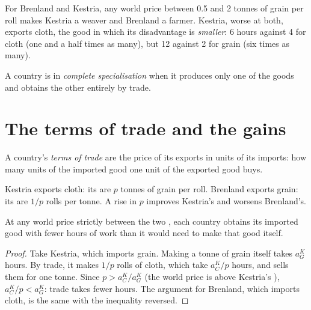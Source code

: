 For Brenland and Kestria, any world price between 0.5 and 2 tonnes of grain per roll makes Kestria a
weaver and Brenland a farmer. Kestria, worse at both, exports cloth, the good in which its disadvantage
is \emph{smaller}: 6 hours against 4 for cloth (one and a half times as many), but 12 against 2 for grain (six times as
many).

\begin{definition}\label{def:g10:ricardo-model:complete-specialisation}
A country is in \emph{complete specialisation} when it produces only one of
the goods and obtains the other entirely by trade.
\end{definition}

\section{The terms of trade and the gains}\label{sec:g10:ricardo-model:gains}

\begin{definition}\label{def:g10:ricardo-model:terms-of-trade}
A country's \emph{terms of trade} are the price of its exports in units of its
imports: how many units of the imported good one unit of the exported good buys.
\end{definition}

Kestria exports cloth: its  are $p$ tonnes of grain per roll. Brenland exports grain: its
 are $1/p$ rolls per tonne. A rise in $p$ improves Kestria's  and worsens
Brenland's.

\begin{proposition}\label{prop:g10:ricardo-model:gains}
At any world price strictly between the two , each country obtains its imported good with
fewer hours of work than it would need to make that good itself.
\end{proposition}
\begin{proof}
Take Kestria, which imports grain. Making a tonne of grain itself takes $a_G^K$ hours. By trade, it makes
$1/p$ rolls of cloth, which take $a_C^K / p$ hours, and sells them for one tonne. Since $p > a_C^K/a_G^K$
(the world price is above Kestria's ), $a_C^K/p < a_G^K$: trade takes fewer hours. The
argument for Brenland, which imports cloth, is the same with the inequality reversed.
\end{proof}

